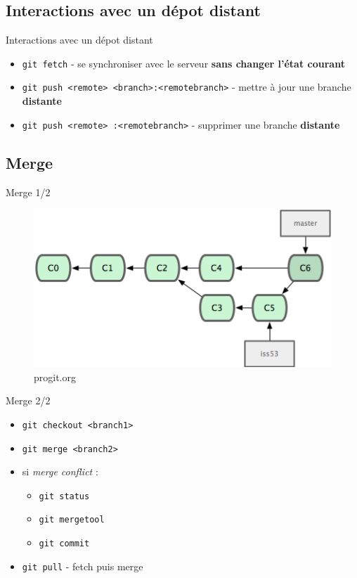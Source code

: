 \documentclass{beamer}
\begin{document}
\subsection*{Interactions avec un dépot distant}
\begin{frame}{Interactions avec un dépot distant}
  \begin{itemize}
  \item \lstinline|git fetch| - se synchroniser avec le serveur
    \textbf{sans changer l'état courant}
  \item \lstinline|git push <remote> <branch>:<remotebranch>| - mettre
    à jour une branche \textbf{distante}
  \item \lstinline|git push <remote> :<remotebranch>| - supprimer une
    branche \textbf{distante}
  \end{itemize}
\end{frame}

\subsection*{Merge}
\begin{frame}{Merge 1/2}
  \begin{figure}
    \begin{center}
      \includegraphics[scale=1]{img/Merge.png}
    \end{center}
    \caption{progit.org}
  \end{figure}
\end{frame}

\begin{frame}{Merge 2/2}
  \begin{itemize}
  \item \lstinline|git checkout <branch1>|
  \item \lstinline|git merge <branch2>|
  \item si \emph{merge conflict} :
    \begin{itemize}
    \item[] \lstinline|git status|
    \item[] \lstinline|git mergetool|
    \item[] \lstinline|git commit|
    \end{itemize}
  \item \lstinline|git pull| - fetch puis merge
  \end{itemize}
\end{frame}
\end{document}
